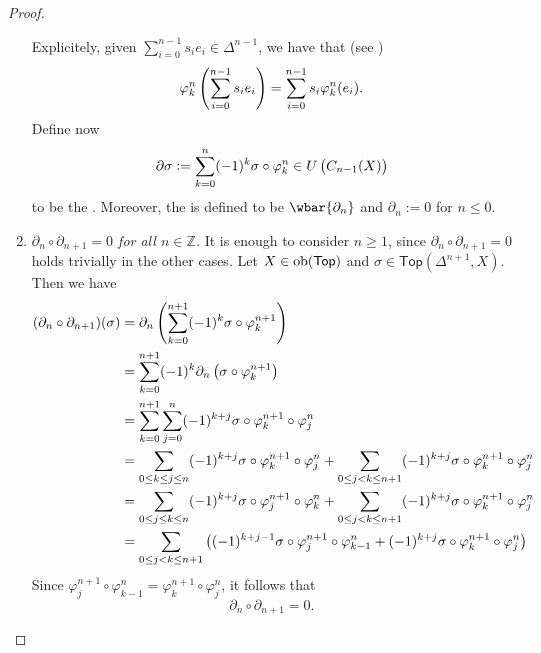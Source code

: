 \begin{proof}
\begin{enumerate}[label = \textit{Step \arabic*:},wide = 0pt, itemsep = 1.5ex]
\begin{equation*}
			\end{equation*}
			Explicitely, given $\sum_{i = 0}^{n - 1} s_i e_i \in \Delta^{n - 1}$, we have that (see \cite[152]{lee:topological_manifolds:2011})
			\begin{equation*}
				\varphi_k^n \del[4]{\sum_{i = 0}^{n - 1}s_i e_i} = \sum_{i = 0}^{n - 1}s_i \varphi_k^n(e_i).
			\end{equation*}
			Define now
			\begin{equation}
				\partial \sigma := \sum_{k = 0}^n (-1)^k \sigma \circ \varphi_k^n \in U\del[1]{C_{n - 1}(X)} 
			\end{equation}
			\noindent to be the . Moreover, the  is defined to be $\wbar{\partial_n}$ and $\partial_n := 0$ for $n \leq 0$.
		\item \textit{$\partial_n \circ \partial_{n + 1} = 0$ for all $n \in \mathbb{Z}$.} It is enough to consider $n \geq 1$, since $\partial_n \circ \partial_{n + 1} = 0$ holds trivially in the other cases. Let $X \in \operatorname{ob}(\mathsf{Top})$ and $\sigma \in \mathsf{Top}(\Delta^{n+1},X)$. Then we have
			\begin{align*}
				(\partial_n \circ \partial_{n + 1})(\sigma) &= \partial_n \del[4]{\sum_{k = 0}^{n + 1} (-1)^k \sigma \circ \varphi^{n + 1}_k}\\
				&= \sum_{k = 0}^{n + 1} (-1)^k \partial_n\del[1]{\sigma \circ \varphi^{n + 1}_k}\\
				&= \sum_{k = 0}^{n + 1}\sum_{j = 0}^n (-1)^{k + j} \sigma \circ \varphi^{n + 1}_k \circ \varphi^n_j\\
				&= \sum_{0 \leq k \leq j \leq n}(-1)^{k + j} \sigma \circ \varphi^{n + 1}_k \circ \varphi^n_j + \sum_{0 \leq j < k \leq n + 1}(-1)^{k + j} \sigma \circ \varphi^{n + 1}_k \circ \varphi^n_j\\
				&= \sum_{0 \leq j \leq k \leq n}(-1)^{k + j} \sigma \circ \varphi^{n + 1}_j \circ \varphi^n_k + \sum_{0 \leq j <k \leq n + 1}(-1)^{k + j} \sigma \circ \varphi^{n + 1}_k \circ \varphi^n_j\\
				&= \sum_{0 \leq j < k \leq n + 1}\del[1]{(-1)^{k + j - 1} \sigma \circ \varphi^{n + 1}_j \circ \varphi^n_{k - 1} + (-1)^{k + j} \sigma \circ \varphi^{n + 1}_k \circ \varphi^n_j}
			\end{align*}
			Since $\varphi_j^{n + 1} \circ \varphi_{k - 1}^n = \varphi_k^{n + 1} \circ \varphi_j^n$, it follows that
			\begin{equation*}
				\partial_n \circ \partial_{n + 1} = 0.
			\end{equation*}

\end{enumerate}
\end{proof}
